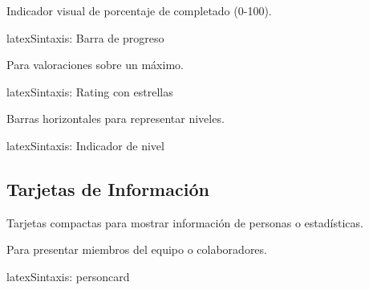 \noindent
{} \quad {} \quad {}

Indicador visual de porcentaje de completado (0-100).

\begin{codigosimple}{latex}{Sintaxis: Barra de progreso}
 
\end{codigosimple}

\noindent
{} \quad {} \quad {} \quad {}

Para valoraciones sobre un máximo.

\begin{codigosimple}{latex}{Sintaxis: Rating con estrellas}
\end{codigosimple}

\noindent
{} \quad {} \quad {}

Barras horizontales para representar niveles.

\begin{codigosimple}{latex}{Sintaxis: Indicador de nivel}
\end{codigosimple}

\noindent
{} \quad {} \quad {}

\subsection{Tarjetas de Información}
\label{subsec:tarjetas}

Tarjetas compactas para mostrar información de personas o estadísticas.

Para presentar miembros del equipo o colaboradores.

\begin{codigosimple}{latex}{Sintaxis: personcard}
\end{codigosimple}

\noindent
{}
\hfill
{}

